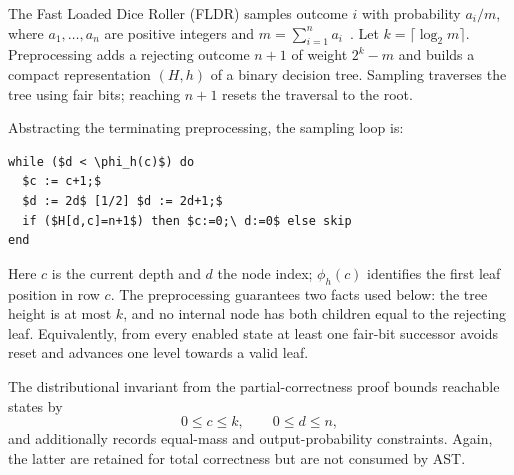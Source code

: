The Fast Loaded Dice Roller (FLDR) samples outcome $i$ with probability $a_i/m$, where $a_1,\ldots,a_n$ are positive integers and $m=\sum_{i=1}^n a_i$~\cite{DBLP:conf/aistats/SaadFRM20}. Let $k=\lceil\log_2 m\rceil$. Preprocessing adds a rejecting outcome $n+1$ of weight $2^k-m$ and builds a compact representation $(H,h)$ of a binary decision tree. Sampling traverses the tree using fair bits; reaching $n+1$ resets the traversal to the root.

Abstracting the terminating preprocessing, the sampling loop is:
\begin{lstlisting}[basicstyle=\ttfamily\small,mathescape=true,frame=single]
while ($d < \phi_h(c)$) do
  $c := c+1;$
  $d := 2d$ [1/2] $d := 2d+1;$
  if ($H[d,c]=n+1$) then $c:=0;\ d:=0$ else skip
end
\end{lstlisting}
Here $c$ is the current depth and $d$ the node index; $\phi_h(c)$ identifies the first leaf position in row $c$. The preprocessing guarantees two facts used below: the tree height is at most $k$, and no internal node has both children equal to the rejecting leaf. Equivalently, from every enabled state at least one fair-bit successor avoids reset and advances one level towards a valid leaf.

The distributional invariant from the partial-correctness proof bounds reachable states by
\begin{equation}
 0\le c\le k,\qquad 0\le d\le n,
 \label{eq:fldr-support}
\end{equation}
and additionally records equal-mass and output-probability constraints. Again, the latter are retained for total correctness but are not consumed by AST.

